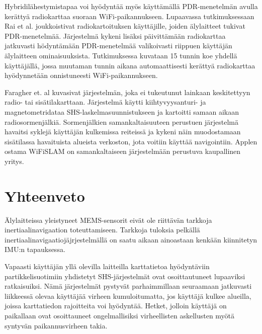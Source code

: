 Hybridilähestymistapaa voi hyödyntää myös käyttämällä PDR-menetelmän avulla
kerättyä radiokarttaa suoraan WiFi-paikannukseen. Lupaavassa
tutkimuksessaan Rai et al. \cite{rai2012} joukkoistivat radiokartoituksen
käyttäjille, joiden älylaitteet tukivat PDR-menetelmää. Järjestelmä
kykeni lisäksi päivittämään radiokarttaa jatkuvasti hödyntämään PDR-menetelmää
valikoivasti riippuen käyttäjän älylaitteen ominaisuuksista. Tutkimuksessa
kuvataan 15 tunnin koe yhdellä käyttäjällä, jossa muutaman tunnin aikana
automaattisesti kerättyä radiokarttaa hyödynnetään onnistuneesti
WiFi-paikannukseen. 

Faragher et. al \cite{faragher2012} kuvasivat järjestelmän, joka ei
tukeutunut lainkaan keskitettyyn radio- tai sisätilakarttaan. Järjestelmä
käytti kiihtyvyysanturi- ja magnetometridataa SHS-laskelmasuunnistukseen ja
kartoitti samaan aikaan radiosormenjälkiä. Sormenjälkien samankaltaisuuteen
perustuen järjestelmä havaitsi syklejä käyttäjän kulkemissa reiteissä
ja kykeni näin muodostamaan sisätilassa havaituista alueista
verkoston, jota voitiin käyttää navigointiin. Applen ostama WiFiSLAM
on samankaltaiseen järjestelmään perustuva kaupallinen yritys.

\section{Yhteenveto}

Älylaitteissa yleistyneet MEMS-sensorit eivät ole riittävän tarkkoja
inertiaalinavigaation toteuttamiseen. Tarkkoja tuloksia
pelkällä inertiaalinavigaatiojäjrjestelmällä
on saatu aikaan
ainoastaan kenkään kiinnitetyn IMU:n tapauksessa.

Vapaasti käyttäjän yllä olevilla laitteilla
karttatietoa hyödyntäviin partikkelisuotimiin yhdistetyt SHS-järjestelmät ovat
osoittautuneet lupaaviksi ratkaisuiksi.
Nämä järjestelmät pystyvät parhaimmillaan seuraamaan jatkuvasti liikkeessä
olevaa käyttäjää virheen kumuloitumatta, jos käyttäjä kulkee alueilla, joissa
karttatiedon rajoitteita voi hyödyntää. Hetket, jolloin käyttäjä on paikallaan
ovat osoittauneet ongelmallisiksi virheellisten askellusten myötä syntyvän
paikannusvirheen takia.

